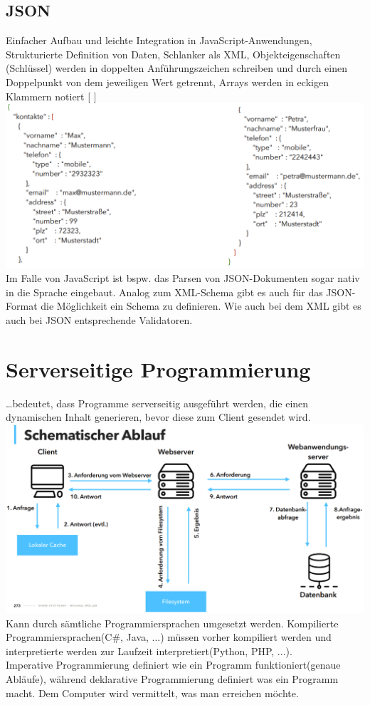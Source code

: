 \documentclass[12pt,a4paper]{article}
\begin{document}
\subsection{JSON}
Einfacher Aufbau und leichte Integration in JavaScript-Anwendungen, Strukturierte Definition von Daten, Schlanker als XML, Objekteigenschaften (Schlüssel) werden in doppelten Anführungszeichen schreiben und durch einen Doppelpunkt von dem jeweiligen Wert getrennt, Arrays werden in eckigen Klammern notiert [   ]\\
\includegraphics[width=\textwidth]{Bilder/json.PNG}
Im Falle von JavaScript ist bspw. das Parsen von JSON-Dokumenten sogar nativ in die
Sprache eingebaut. Analog zum XML-Schema gibt es auch für das JSON-Format die Möglichkeit ein Schema zu definieren. Wie auch bei dem XML gibt es auch bei JSON entsprechende Validatoren.

\section{Serverseitige Programmierung}
…bedeutet, dass Programme serverseitig ausgeführt werden, die einen dynamischen Inhalt generieren, bevor diese zum Client gesendet wird. \\
\includegraphics[width=\textwidth]{Bilder/serverseitige_programmierung.PNG}
Kann durch sämtliche Programmiersprachen umgesetzt werden. Kompilierte Programmiersprachen(C\#, Java, ...) müssen vorher kompiliert werden und interpretierte werden zur Laufzeit interpretiert(Python, PHP, ...).\\
Imperative Programmierung definiert wie ein Programm funktioniert(genaue Abläufe), während deklarative Programmierung definiert was ein Programm macht. Dem Computer wird vermittelt, was man erreichen möchte.
\end{document}
